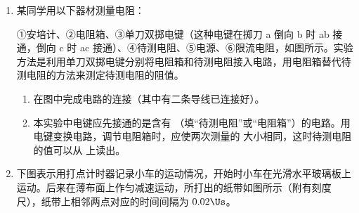 \documentclass[\gkver]{gaokaozhenti}
\begin{document}
\begin{enumerate}
\onepicture[align=right, h=6.13cm]{}


\item
某同学用以下器材测量电阻：

①安培计、②电阻箱、③单刀双掷电键（这种电键在掷刀 a 倒向 b 时 ab 接通，倒向 c 时 ac 接通）、④待测电阻、⑤电源、⑥限流电阻，如图所示。实验方法是利用单刀双掷电键分别将电阻箱和待测电阻接入电路，用电阻箱替代待测电阻的方法来测定待测电阻的阻值。
\begin{enumerate}
	\item
	在图中完成电路的连接（其中有二条导线已连接好）。

	\item
	本实验中电键应先接通的是含有 （填“待测电阻”或“电阻箱”）的电路。用电键变换电路，调节电阻箱时，应使两次测量的  大小相同，这时待测电阻的值可以从  上读出。
\end{enumerate}
\onepicture[align=right, w=7.00cm]{}


\item
下图表示用打点计时器记录小车的运动情况，开始时小车在光滑水平玻璃板上运动。后来在薄布面上作匀减速运动，所打出的纸带如图所示（附有刻度尺），纸带上相邻两点对应的时间间隔为 $0.02\Us$。


\end{enumerate}
\end{document}
